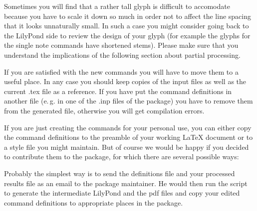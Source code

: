 \documentclass{OLLbook}
\begin{document}
Sometimes you will find that a rather tall glyph is difficult to accomodate because you have to scale it down so much in order not to affect the line spacing that it looks unnaturally small.
In such a case you might consider going back to the LilyPond side to review the design of your glyph (for example the glyphs for the single note commands have shortened stems).
Please make sure that you understand the implications of the following section about partial processing.

\medskip
If you are satisfied with the new commands you will have to move them to a useful place.
In any case you should keep copies of the input files as well as the current .tex file as a reference.
If you have put the command definitions in another file (e.\,g. in one of the .inp files of the \lilyglyphs package) you have to remove them from the generated file, otherwise you will get compilation errors.

If you are just creating the commands for your personal use, you can either copy the command definitions to the preamble of your working \LaTeX{} document or to a style file you might maintain.
But of course we would be happy if you decided to contribute them to the package, for which there are several possible ways:

Probably the simplest way is to send the definitions file and your processed results file as an email to the package maintainer. He would then run the script to generate the intermediate LilyPond and the pdf files and copy your edited command definitions to appropriate places in the package.
\end{document}
